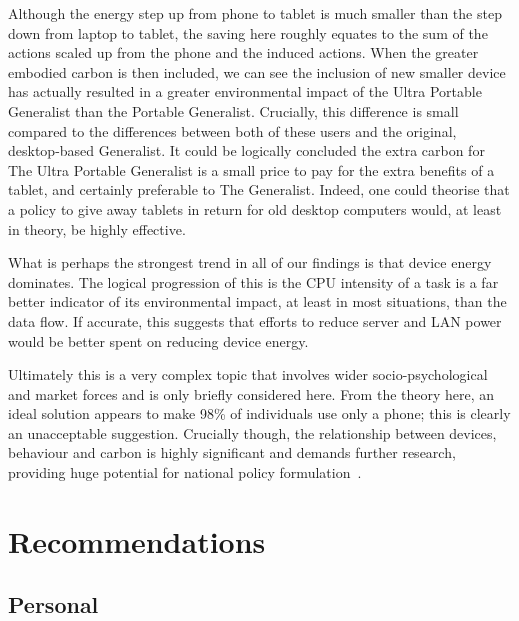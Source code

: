 \documentclass[conference]{IEEEtran}
\begin{document}
Although the energy step up from phone to tablet is much smaller than
the step down from laptop to tablet, the saving here roughly equates
to the sum of the actions scaled up from the phone and the induced
actions. When the greater embodied carbon is then included, we can see
the inclusion of new smaller device has actually resulted in a greater
environmental impact of the Ultra Portable Generalist than the
Portable Generalist. Crucially, this difference is small compared to
the differences between both of these users and the original,
desktop-based Generalist. It could be logically concluded the extra
carbon for The Ultra Portable Generalist is a small price to pay for
the extra benefits of a tablet, and certainly preferable to The
Generalist. Indeed, one could theorise that a policy to give away
tablets in return for old desktop computers would, at least in theory,
be highly effective.


What is perhaps the strongest trend in all of our findings is that
device energy dominates. The logical progression of this is the CPU
intensity of a task is a far better indicator of its environmental
impact, at least in most situations, than the data flow. If accurate,
this suggests that efforts to reduce server and LAN power would be
better spent on reducing device energy.

Ultimately this is a very complex topic that involves wider
socio-psychological and market forces and is only briefly considered
here. From the theory here, an ideal solution appears to make 98\% of
individuals use only a phone; this is clearly an unacceptable
suggestion. Crucially though, the relationship between devices,
behaviour and carbon is highly significant and demands further
research, providing huge potential for national policy
formulation~\cite{smart2020:2008,ruth:2011}.


\section{Recommendations}

\subsection{Personal}
\end{document}
